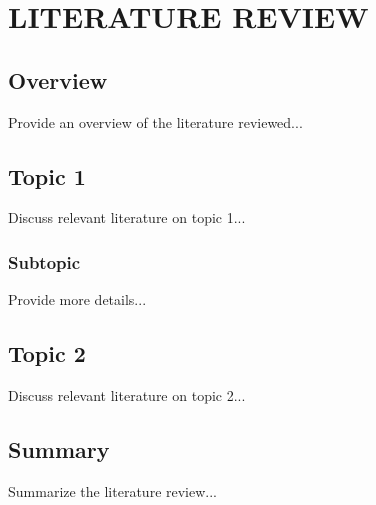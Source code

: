 
\chapter{LITERATURE REVIEW}

\ifpdf
    \graphicspath{{literature_review/figures/PNG}{literature_review/figures/PDF}{literature_review/figures}}
\else
    \graphicspath{{literature_review/figures/EPS}{literature_review/figures}}
\fi

\section{Overview}
Provide an overview of the literature reviewed...

\section{Topic 1}
Discuss relevant literature on topic 1...

\subsection{Subtopic}
Provide more details...

\section{Topic 2}
Discuss relevant literature on topic 2...

\section{Summary}
Summarize the literature review...
